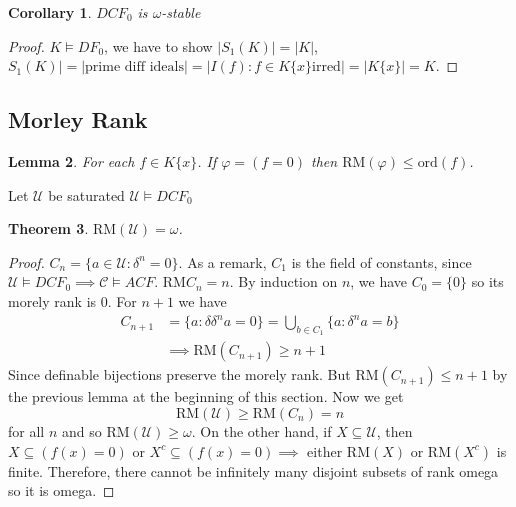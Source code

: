 \documentclass[letterpaper, 12pt]{article}
\newcommand{\cU}{\mathcal{U}}
\newcommand{\cC}{\mathcal{C}}
\newcommand{\RM}{\mbox{RM}}
\newcommand{\ord}{\mbox{ord}}
\theoremstyle{stdthm}
\newtheorem{thm}{Theorem}[section]
\newtheorem{lem}[thm]{Lemma}
\newtheorem{cor}[thm]{Corollary}
\theoremstyle{stddef}
\theoremstyle{stdnonum}
\theoremstyle{stdqands}
\theoremstyle{stdbold}
\begin{document}
\begin{cor}
$DCF_0$ is $\omega$-stable
\end{cor}

\begin{proof}
$K \models DF_0$,  we have to show $|S_1(K)| = |K|$, $S_1(K) | = |\mbox{prime diff ideals}| = |I(f): f \in K\{x\} \mbox{irred}| = |K \{x\}| = K$.  
\end{proof}

\subsection*{Morley Rank}
\begin{lem}
For each $f \in K\{x\}$. If $\varphi = (f =0)$ then $\RM(\varphi) \leq \ord(f)$. 
\end{lem}

Let $\cU$ be saturated $\cU \models DCF_0$
\begin{thm}
$\RM(\cU) = \omega$. 
\end{thm}

\begin{proof}
$C_n = \{a \in \cU: \delta^n = 0\}$. As a remark, $C_1$ is the field of constants, since $\cU \models DCF_0 \implies \cC \models ACF$. $\RM C_n =n$. By induction on $n$, we have $C_0 = \{0\}$ so its morely rank is 0. For $n+1$ we have 
\begin{align*}
C_{n+1} &= \{a: \delta \delta^n a = 0\} = \bigcup_{b \in C_1} \{a: \delta^n a = b\} \\
&\implies \RM(C_{n+1}) \geq n+1
\end{align*}
Since definable bijections preserve the morely rank. But $\RM(C_{n+1}) \leq n+1$ by the previous lemma at the beginning of this section. Now we get 
\[ \RM(\cU) \geq \RM(C_n)  = n \]
for all $n$ and so $\RM(\cU) \geq \omega$. On the other hand, if $X \subseteq \cU$, then $X \subseteq (f(x) = 0)$ or $X^c \subseteq (f(x) = 0) \implies $ either $\RM(X)$ or $\RM(X^c)$ is finite. Therefore, there cannot be infinitely many disjoint subsets of rank omega so it is omega.  
\end{proof}
\end{document}
